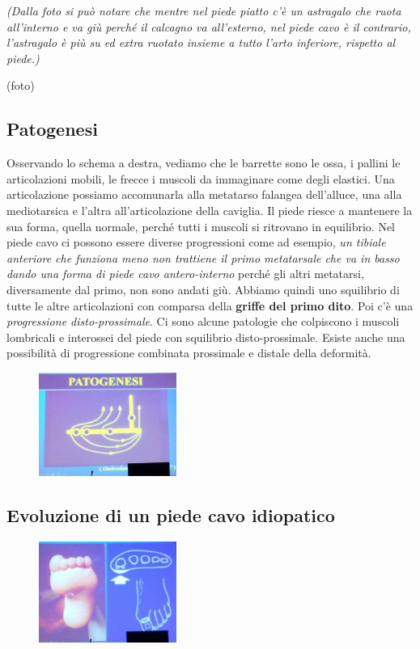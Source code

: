 \emph{(Dalla foto si può notare che mentre nel piede piatto c'è un astragalo che ruota all'interno e va giù perché il calcagno va all'esterno, nel piede cavo è il contrario, l'astragalo è più su ed extra ruotato insieme a tutto l'arto inferiore, rispetto al piede.)}

(foto)

\subsection{Patogenesi}

Osservando lo schema a destra, vediamo che le barrette sono le ossa, i pallini le articolazioni mobili, le frecce i muscoli da immaginare come degli elastici. Una articolazione possiamo accomunarla alla metatarso falangea dell'alluce, una alla mediotarsica e l'altra all'articolazione della caviglia. Il piede riesce a mantenere la sua forma, quella normale, perché tutti i muscoli si ritrovano in equilibrio. Nel piede cavo ci possono essere diverse progressioni come ad esempio, \emph{un tibiale anteriore che funziona meno non trattiene il primo metatarsale che va in basso dando una forma di piede cavo antero-interno} perché gli altri metatarsi, diversamente dal primo, non sono andati giù. Abbiamo quindi uno squilibrio di tutte le altre articolazioni con comparsa della \textbf{griffe del primo dito}. Poi c'è una \emph{progressione disto-prossimale}. Ci sono alcune patologie che colpiscono i muscoli lombricali e interossei del piede con squilibrio disto-prossimale.
Esiste anche una possibilità di progressione combinata prossimale e distale della deformità.

\begin{figure}[!ht]
\centering
\includegraphics[width=0.4\textwidth]{017/image5.jpg}
\end{figure}

\subsection{Evoluzione di un piede cavo idiopatico }

\begin{figure}[!ht]
\centering
\includegraphics[width=0.4\textwidth]{017/image6.jpg}
\end{figure}

